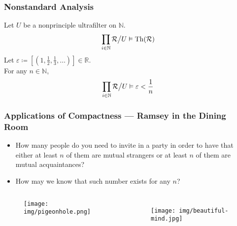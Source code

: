 \documentclass[UTF8,aspectratio=43,11pt,colorlinks,compress,openany]{beamer}%
\begin{document}
\begin{frame}\frametitle{Nonstandard Analysis}
Let $U$ be a nonprinciple ultrafilter on $\mathbb{N}$.
\[\prod\limits_{i\in\mathbb{N}}\mathcal{R}\big\slash U\vDash\operatorname{Th}(\mathcal{R})\]
Let $\varepsilon\coloneqq \left[(1,\frac{1}{2},\frac{1}{3},\dots)\right]\in\mathbb{R}$.\\
For any $n\in\mathbb{N}$,
\[\prod\limits_{i\in\mathbb{N}}\mathcal{R}\big\slash U\vDash\varepsilon<\frac{1}{n}\]
\end{frame}

\begin{frame}\frametitle{\small Applications of Compactness --- Ramsey in the Dining Room}
	\begin{problem}
		\begin{itemize}
			\item How many people do you need to invite in a party in order to have that either at least $n$ of them are mutual strangers or at least $n$ of them are mutual acquaintances?
			\item How may we know that such number exists for any $n$?
		\end{itemize}
	\end{problem}
	\begin{columns}
			\begin{center}
				\begin{figure}
					\texttt{[image: img/pigeonhole.png]}
				\end{figure}
			\end{center}
			\begin{center}\vspace{-7pt}
			\end{center}
		\begin{figure}
		\texttt{[image: img/beautiful-mind.jpg]}
		\end{figure}
	\end{columns}
\end{frame}
\end{document}
